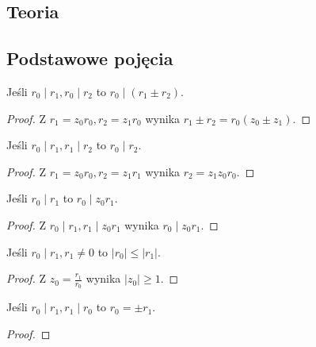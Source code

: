 \begin{appendices}

\chapter{Teoria}
\section{Podstawowe pojęcia}
\begin{theorem}
Jeśli $r_0 \mid r_1, r_0 \mid r_2$ to $r_0 \mid (r_1 \pm r_2)$.
\begin{proof}
Z $r_1 = z_0r_0, r_2 = z_1r_0$ wynika $r_1 \pm r_2 = r_0(z_0 \pm z_1)$.
\end{proof}
\end{theorem}
\begin{theorem}
Jeśli $r_0 \mid r_1, r_1 \mid r_2$ to $r_0 \mid r_2$.
\begin{proof}
Z $r_1 = z_0r_0, r_2 = z_1r_1$ wynika $r_2 = z_1z_0r_0$.
\end{proof}
\end{theorem}
\begin{theorem}
Jeśli $r_0 \mid r_1$ to $r_0 \mid z_0r_1$.
\begin{proof}
Z $r_0 \mid r_1, r_1 \mid z_0r_1$ wynika $r_0 \mid z_0r_1$.
\end{proof}
\end{theorem}
\begin{theorem}
Jeśli $r_0 \mid r_1, r_1 \neq 0$ to $|r_0| \leq |r_1|$.
\begin{proof}
Z $z_0 = \frac{r_1}{r_0}$ wynika $|z_0| \geq 1$.
\end{proof}
\end{theorem}
\begin{theorem}
Jeśli $r_0 \mid r_1, r_1 \mid r_0$ to $r_0 = \pm r_1$.
\begin{proof}

\end{proof}
\end{theorem}
\end{appendices}
